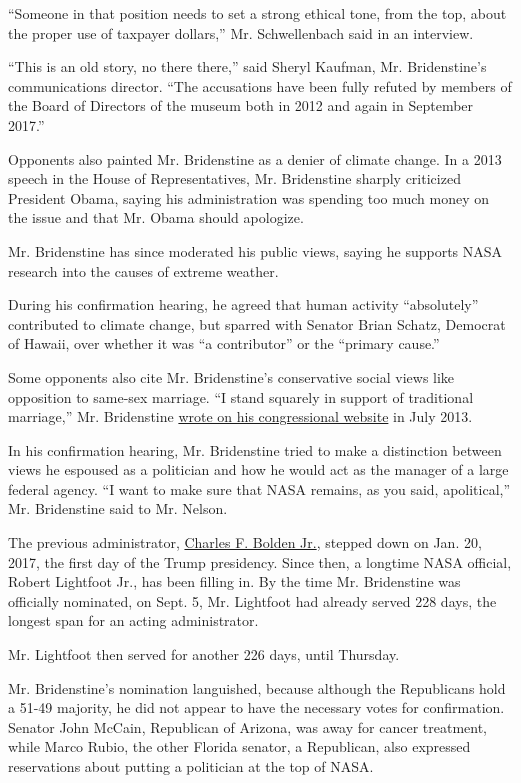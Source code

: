 ``Someone in that position needs to set a strong ethical tone, from the
top, about the proper use of taxpayer dollars,'' Mr. Schwellenbach said
in an interview.

``This is an old story, no there there,'' said Sheryl Kaufman, Mr.
Bridenstine's communications director. ``The accusations have been fully
refuted by members of the Board of Directors of the museum both in 2012
and again in September 2017.''

Opponents also painted Mr. Bridenstine as a denier of climate change. In
a 2013 speech in the House of Representatives, Mr. Bridenstine sharply
criticized President Obama, saying his administration was spending too
much money on the issue and that Mr. Obama should apologize.

Mr. Bridenstine has since moderated his public views, saying he supports
NASA research into the causes of extreme weather.

During his confirmation hearing, he agreed that human activity
``absolutely'' contributed to climate change, but sparred with Senator
Brian Schatz, Democrat of Hawaii, over whether it was ``a contributor''
or the ``primary cause.''

Some opponents also cite Mr. Bridenstine's conservative social views
like opposition to same-sex marriage. ``I stand squarely in support of
traditional marriage,'' Mr. Bridenstine
\href{https://bridenstine.house.gov/news/documentsingle.aspx?DocumentID=46}{wrote
on his congressional website} in July 2013.

In his confirmation hearing, Mr. Bridenstine tried to make a distinction
between views he espoused as a politician and how he would act as the
manager of a large federal agency. ``I want to make sure that NASA
remains, as you said, apolitical,'' Mr. Bridenstine said to Mr. Nelson.

The previous administrator,
\href{http://www.nytimes.com/2010/02/26/science/space/26nasa.html}{Charles
F. Bolden Jr.}, stepped down on Jan. 20, 2017, the first day of the
Trump presidency. Since then, a longtime NASA official, Robert Lightfoot
Jr., has been filling in. By the time Mr. Bridenstine was officially
nominated, on Sept. 5, Mr. Lightfoot had already served 228 days, the
longest span for an acting administrator.

Mr. Lightfoot then served for another 226 days, until Thursday.

Mr. Bridenstine's nomination languished, because although the
Republicans hold a 51-49 majority, he did not appear to have the
necessary votes for confirmation. Senator John McCain, Republican of
Arizona, was away for cancer treatment, while Marco Rubio, the other
Florida senator, a Republican, also expressed reservations about putting
a politician at the top of NASA.


